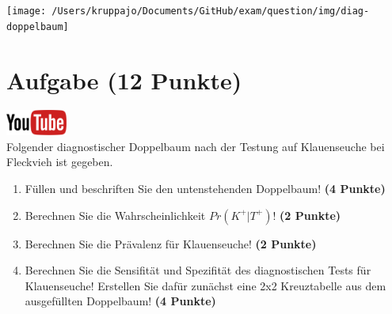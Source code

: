 \documentclass[a4paper, 10pt]{scrartcl}\usepackage[]{graphicx}\usepackage[]{xcolor}
\begin{document}
\vspace{1cm}

\begin{center}
  \texttt{[image: /Users/kruppajo/Documents/GitHub/exam/question/img/diag-doppelbaum]}
\end{center}



 
\clearpage

\section{Aufgabe \hfill (12 Punkte)}


\hfill\href{https://youtu.be/_7s44pbOc00}{\includegraphics[width =
  2cm]{img/youtube}}\\[1Ex]





Folgender diagnostischer Doppelbaum nach der Testung auf Klauenseuche bei
Fleckvieh ist gegeben.

\begin{enumerate}
\item F{\"u}llen und beschriften Sie den untenstehenden Doppelbaum! \textbf{(4
    Punkte)}
\item Berechnen Sie die Wahrscheinlichkeit $Pr(K^+|T^+)$! \textbf{(2 Punkte)}
\item Berechnen Sie die Pr{\"a}valenz f{\"u}r Klauenseuche! \textbf{(2 Punkte)}
\item Berechnen Sie die Sensifit{\"a}t und Spezifit{\"a}t des diagnostischen Tests
  f{\"u}r Klauenseuche! Erstellen Sie daf{\"u}r zun{\"a}chst eine 2x2 Kreuztabelle aus
  dem ausgef{\"u}llten Doppelbaum!
  \textbf{(4 Punkte)}
\end{enumerate}

\vspace{1cm}
 
\end{document}
